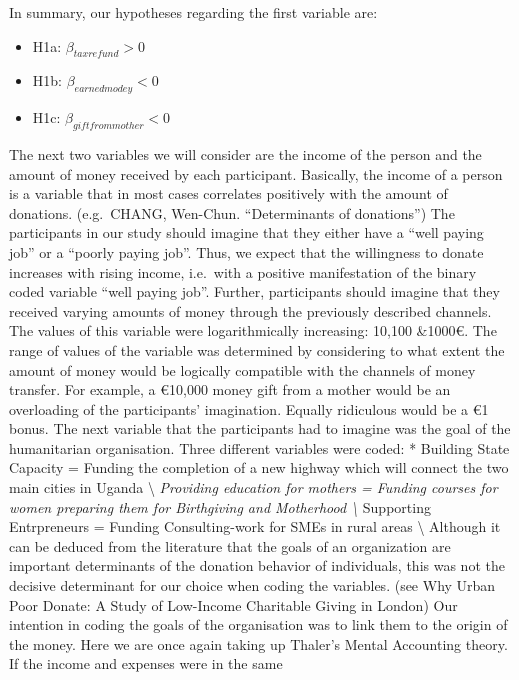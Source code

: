 \documentclass[
  12pt,
]{article}
\providecommand{\tightlist}{%
  \setlength{\itemsep}{0pt}\setlength{\parskip}{0pt}}
\begin{document}
In summary, our hypotheses regarding the first variable are:

\begin{itemize}
\tightlist
\item
  H1a: \(\beta_{taxrefund} > 0\)
\item
  H1b: \(\beta_{earnedmodey} < 0\)
\item
  H1c: \(\beta_{giftfrommother} < 0\)
\end{itemize}

The next two variables we will consider are the income of the person and
the amount of money received by each participant. Basically, the income
of a person is a variable that in most cases correlates positively with
the amount of donations. (e.g.~CHANG, Wen-Chun. ``Determinants of
donations'') The participants in our study should imagine that they
either have a ``well paying job'' or a ``poorly paying job''. Thus, we
expect that the willingness to donate increases with rising income,
i.e.~with a positive manifestation of the binary coded variable ``well
paying job''. Further, participants should imagine that they received
varying amounts of money through the previously described channels. The
values of this variable were logarithmically increasing: 10,100 \&1000€.
The range of values of the variable was determined by considering to
what extent the amount of money would be logically compatible with the
channels of money transfer. For example, a €10,000 money gift from a
mother would be an overloading of the participants' imagination. Equally
ridiculous would be a €1 bonus. The next variable that the participants
had to imagine was the goal of the humanitarian organisation. Three
different variables were coded: * Building State Capacity = Funding the
completion of a new highway which will connect the two main cities in
Uganda \textbackslash{} \emph{Providing education for mothers = Funding
courses for women preparing them for Birthgiving and Motherhood
\textbackslash{} }Supporting Entrpreneurs = Funding Consulting-work for
SMEs in rural areas \textbackslash{} Although it can be deduced from the
literature that the goals of an organization are important determinants
of the donation behavior of individuals, this was not the decisive
determinant for our choice when coding the variables. (see Why Urban
Poor Donate: A Study of Low-Income Charitable Giving in London) Our
intention in coding the goals of the organisation was to link them to
the origin of the money. Here we are once again taking up Thaler's
Mental Accounting theory. If the income and expenses were in the same
\end{document}
